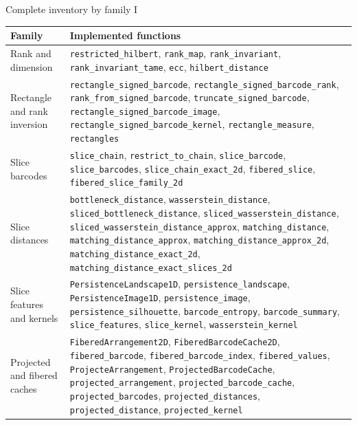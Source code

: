 \documentclass[aspectratio=169,11pt]{beamer}
\begin{document}
\begin{frame}{Complete inventory by family I}
\scriptsize
\begin{tabularx}{\textwidth}{>{\raggedright\arraybackslash}p{2.8cm}X}
\toprule
Family & Implemented functions \\
\midrule
Rank and dimension & \texttt{restricted\_hilbert}, \texttt{rank\_map}, \texttt{rank\_invariant}, \texttt{rank\_invariant\_tame}, \texttt{ecc}, \texttt{hilbert\_distance} \\
Rectangle and rank inversion & \texttt{rectangle\_signed\_barcode}, \texttt{rectangle\_signed\_barcode\_rank}, \texttt{rank\_from\_signed\_barcode}, \texttt{truncate\_signed\_barcode}, \texttt{rectangle\_signed\_barcode\_image}, \texttt{rectangle\_signed\_barcode\_kernel}, \texttt{rectangle\_measure}, \texttt{rectangles} \\
Slice barcodes & \texttt{slice\_chain}, \texttt{restrict\_to\_chain}, \texttt{slice\_barcode}, \texttt{slice\_barcodes}, \texttt{slice\_chain\_exact\_2d}, \texttt{fibered\_slice}, \texttt{fibered\_slice\_family\_2d} \\
Slice distances & \texttt{bottleneck\_distance}, \texttt{wasserstein\_distance}, \texttt{sliced\_bottleneck\_distance}, \texttt{sliced\_wasserstein\_distance}, \texttt{sliced\_wasserstein\_distance\_approx}, \texttt{matching\_distance}, \texttt{matching\_distance\_approx}, \texttt{matching\_distance\_approx\_2d}, \texttt{matching\_distance\_exact\_2d}, \texttt{matching\_distance\_exact\_slices\_2d} \\
Slice features and kernels & \texttt{PersistenceLandscape1D}, \texttt{persistence\_landscape}, \texttt{PersistenceImage1D}, \texttt{persistence\_image}, \texttt{persistence\_silhouette}, \texttt{barcode\_entropy}, \texttt{barcode\_summary}, \texttt{slice\_features}, \texttt{slice\_kernel}, \texttt{wasserstein\_kernel} \\
Projected and fibered caches & \texttt{FiberedArrangement2D}, \texttt{FiberedBarcodeCache2D}, \texttt{fibered\_barcode}, \texttt{fibered\_barcode\_index}, \texttt{fibered\_values}, \texttt{ProjecteArrangement}, \texttt{ProjectedBarcodeCache}, \texttt{projected\_arrangement}, \texttt{projected\_barcode\_cache}, \texttt{projected\_barcodes}, \texttt{projected\_distances}, \texttt{projected\_distance}, \texttt{projected\_kernel} \\
\bottomrule
\end{tabularx}
\end{frame}
\end{document}
